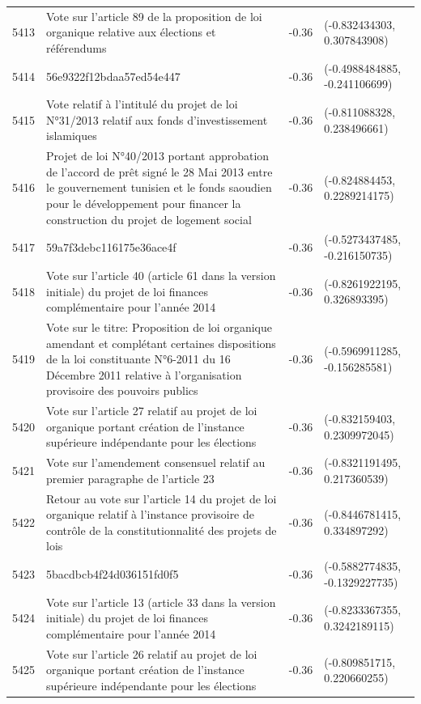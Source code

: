 \begin{table}[ht]
\begin{tabular}{rlrl}
  5413 & Vote sur l'article 89 de la proposition de loi organique relative aux élections et référendums & -0.36 & (-0.832434303, 0.307843908) \\ 
  5414 & 56e9322f12bdaa57ed54e447 & -0.36 & (-0.4988484885, -0.241106699) \\ 
  5415 & Vote relatif à l'intitulé du projet de loi N°31/2013 relatif aux fonds d'investissement islamiques & -0.36 & (-0.811088328, 0.238496661) \\ 
  5416 & Projet de loi N°40/2013 portant approbation de l'accord de prêt signé le 28 Mai 2013 entre le gouvernement tunisien et le fonds saoudien pour le développement pour financer la construction du projet de logement social & -0.36 & (-0.824884453, 0.2289214175) \\ 
  5417 & 59a7f3debc116175e36ace4f & -0.36 & (-0.5273437485, -0.216150735) \\ 
  5418 & Vote sur l'article 40 (article 61 dans la version initiale) du projet de loi finances complémentaire pour l'année 2014 & -0.36 & (-0.8261922195, 0.326893395) \\ 
  5419 & Vote sur le titre: Proposition de loi organique amendant et complétant certaines dispositions de la loi constituante N°6-2011 du 16 Décembre 2011 relative à l'organisation provisoire des pouvoirs publics & -0.36 & (-0.5969911285, -0.156285581) \\ 
  5420 & Vote sur l'article 27 relatif au projet de loi organique portant création de l'instance supérieure indépendante pour les élections & -0.36 & (-0.832159403, 0.2309972045) \\ 
  5421 & Vote sur l'amendement consensuel relatif au premier paragraphe de l'article 23 & -0.36 & (-0.8321191495, 0.217360539) \\ 
  5422 & Retour au vote sur l'article 14 du projet de loi organique relatif à l'instance provisoire de contrôle de la constitutionnalité des projets de lois & -0.36 & (-0.8446781415, 0.334897292) \\ 
  5423 & 5bacdbcb4f24d036151fd0f5 & -0.36 & (-0.5882774835, -0.1329227735) \\ 
  5424 & Vote sur l'article 13 (article 33 dans la version initiale) du projet de loi finances complémentaire pour l'année 2014 & -0.36 & (-0.8233367355, 0.3242189115) \\ 
  5425 & Vote sur l'article 26 relatif au projet de loi organique portant création de l'instance supérieure indépendante pour les élections & -0.36 & (-0.809851715, 0.220660255) \\ 

\end{tabular}
\end{table}
